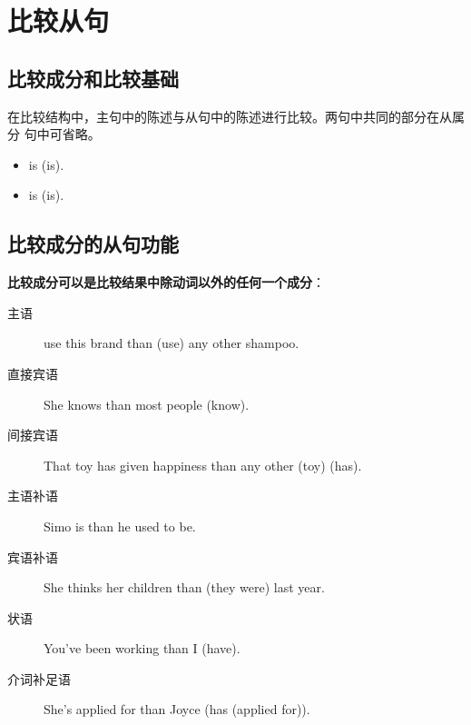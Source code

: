 

\chapter{比较从句}

\section{比较成分和比较基础}

在比较结构中，主句中的陈述与从句中的陈述进行比较。两句中共同的部分在从属分
句中可省略。
\begin{itemize}
\item {} is   
   (is).
\item {} is  
   (is).
\end{itemize}

\section{比较成分的从句功能}

\textbf{比较成分可以是比较结果中除动词以外的任何一个成分}：
\begin{description}
\item[主语]  use this brand than (use) any other shampoo.

\item[直接宾语] She knows  than most people (know).

\item[间接宾语] That toy has given  happiness than any other (toy) (has).

\item[主语补语] Simo is  than he used to be.

\item[宾语补语] She thinks her children  than (they were) last year.
\item[状语] You've been working  than I (have).

\item[介词补足语] She's applied for  than Joyce (has (applied for)).
\end{description}

